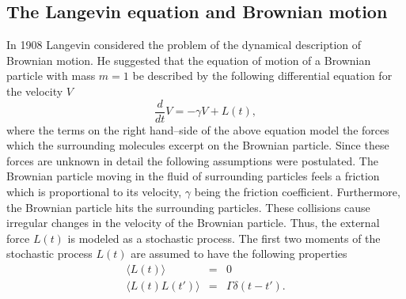 \subsection{The Langevin equation and Brownian motion}
In 1908 Langevin considered the problem of the dynamical 
description of Brownian motion. He suggested that the equation of 
motion of a Brownian particle with mass $m=1$ be described by the
following differential equation for the velocity $V$
\begin{equation}
\label{LANGEVIN}
\frac{d}{dt} V = -\gamma V + L(t),
\end{equation}
where the terms on the right hand--side of the above equation 
model the forces which the surrounding molecules excerpt on the 
Brownian particle. Since these forces are unknown in detail the 
following assumptions were postulated. The Brownian particle 
moving in the fluid of surrounding particles feels
a friction which is proportional to its velocity, $\gamma$  being 
the friction coefficient. Furthermore, the Brownian particle hits
the surrounding particles. These collisions cause irregular 
changes in the velocity of the Brownian particle. Thus, the external force
$L(t)$ is modeled as a stochastic process. The first two moments of the
stochastic process $L(t)$ are assumed to 
have the following properties
\begin{eqnarray*}
\langle L(t) \rangle &=& 0 \\
\langle L(t) L(t') \rangle &=& \Gamma \delta(t-t').
\end{eqnarray*}

